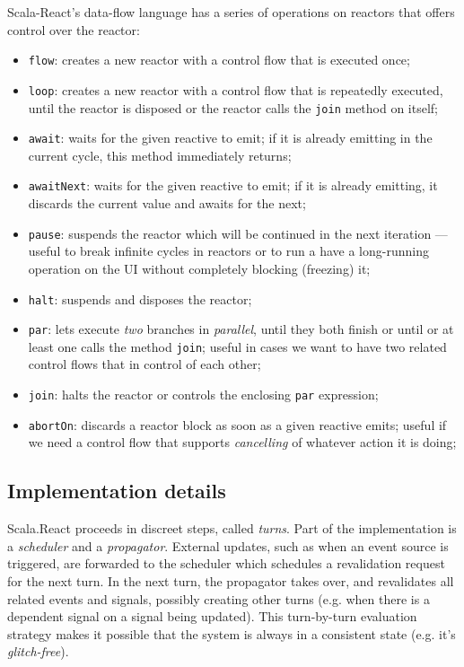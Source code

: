 Scala-React's data-flow language has a series of operations on reactors that offers control over the reactor:
\begin{itemize}
\item \texttt{flow}: creates a new reactor with a control flow that is executed once;
\item \texttt{loop}: creates a new reactor with a control flow that is repeatedly executed, until the reactor is disposed or the reactor calls the \texttt{join} method on itself;
\item \texttt{await}: waits for the given reactive to emit; if it is already emitting in the current cycle, this method immediately returns;
\item \texttt{awaitNext}: waits for the given reactive to emit; if it is already emitting, it discards the current value and awaits for the next;
\item \texttt{pause}: suspends the reactor which will be continued in the next iteration --- useful to break infinite cycles in reactors or to run a have a long-running operation on the UI without completely blocking (freezing) it;
\item \texttt{halt}: suspends and disposes the reactor;
\item \texttt{par}: lets execute \emph{two} branches in \emph{parallel}, until they both finish or until or at least one calls the method \texttt{join}; useful in cases we want to have two related control flows that in control of each other;
\item \texttt{join}: halts the reactor or controls the enclosing \texttt{par} expression;
\item \texttt{abortOn}: discards a reactor block as soon as a given reactive emits; useful if we need a control flow that supports \emph{cancelling} of whatever action it is doing;
\end{itemize}

\subsection{Implementation details}\label{sec:scala-react-impl}

Scala.React proceeds in discreet steps, called \emph{turns}. Part of the implementation is a \emph{scheduler} and a \emph{propagator}. External updates, such as when an event source is triggered, are forwarded to the scheduler which schedules a revalidation request for the next turn. In the next turn, the propagator takes over, and revalidates all related events and signals, possibly creating other turns (e.g. when there is a dependent signal on a signal being updated). This turn-by-turn evaluation strategy makes it possible that the system is always in a consistent state (e.g. it's \emph{glitch-free}). 

